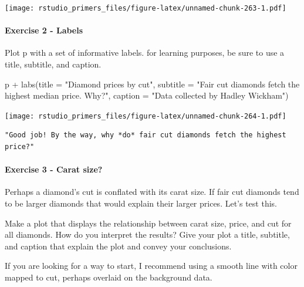 \documentclass[
]{article}
\newenvironment{Shaded}{\begin{snugshade}}{\end{snugshade}}
\newcommand{\AttributeTok}[1]{\textcolor[rgb]{0.77,0.63,0.00}{#1}}
\newcommand{\FunctionTok}[1]{\textcolor[rgb]{0.00,0.00,0.00}{#1}}
\newcommand{\NormalTok}[1]{#1}
\newcommand{\SpecialCharTok}[1]{\textcolor[rgb]{0.00,0.00,0.00}{#1}}
\newcommand{\StringTok}[1]{\textcolor[rgb]{0.31,0.60,0.02}{#1}}
\begin{document}
\texttt{[image: rstudio\_primers\_files/figure-latex/unnamed-chunk-263-1.pdf]}

\hypertarget{exercise-2---labels}{%
\paragraph{Exercise 2 - Labels}\label{exercise-2---labels}}

Plot p with a set of informative labels. for learning purposes, be sure
to use a title, subtitle, and caption.

\begin{Shaded}
\begin{Highlighting}[]
\NormalTok{p }\SpecialCharTok{+} \FunctionTok{labs}\NormalTok{(}\AttributeTok{title =} \StringTok{"Diamond prices by cut"}\NormalTok{,}
         \AttributeTok{subtitle =} \StringTok{"Fair cut diamonds fetch the highest median price. Why?"}\NormalTok{,}
         \AttributeTok{caption =} \StringTok{"Data collected by Hadley Wickham"}\NormalTok{)}
\end{Highlighting}
\end{Shaded}

\texttt{[image: rstudio\_primers\_files/figure-latex/unnamed-chunk-264-1.pdf]}

\begin{verbatim}
"Good job! By the way, why *do* fair cut diamonds fetch the highest price?"
\end{verbatim}

\hypertarget{exercise-3---carat-size}{%
\paragraph{Exercise 3 - Carat size?}\label{exercise-3---carat-size}}

Perhaps a diamond's cut is conflated with its carat size. If fair cut
diamonds tend to be larger diamonds that would explain their larger
prices. Let's test this.

Make a plot that displays the relationship between carat size, price,
and cut for all diamonds. How do you interpret the results? Give your
plot a title, subtitle, and caption that explain the plot and convey
your conclusions.

If you are looking for a way to start, I recommend using a smooth line
with color mapped to cut, perhaps overlaid on the background data.
\end{document}
